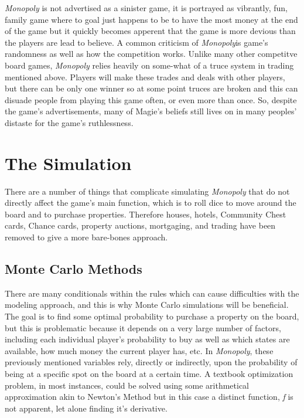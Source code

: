 \documentclass{article}
\begin{document}
\textit{Monopoly} is not advertised as a sinister game, it is portrayed as vibrantly, fun, family game where to goal just happens to be to have the most money at the end of the game but it quickly becomes apperent that the game is more devious than the players are lead to believe. A common criticism of  \textit{Monopoly}is game's randomness as well as how the competition works.  Unlike many other competitve board games, \textit{Monopoly} relies heavily on some-what of a truce system in trading mentioned above.  Players will make these trades and deals with other players, but there can be only one winner so at some point truces are broken and this can disuade people from playing this game often, or even more than once.  So, despite the game's advertisements, many of Magie's beliefs still lives on in many peoples' distaste for the game's ruthlessness.

\section{The Simulation}

There are a number of things that complicate simulating \textit{Monopoly} that do not directly affect the game’s main function, which is to roll dice to move around the board and to purchase properties.  Therefore houses, hotels, Community Chest cards, Chance cards, property auctions, mortgaging, and trading have been removed to give a more bare-bones approach.

\subsection{Monte Carlo Methods}

There are many conditionals within the rules which can cause difficulties with the modeling approach, and this is why Monte Carlo simulations will be beneficial.  The goal is to find some optimal probability to purchase a property on the board, but this is problematic because it depends on a very large number of factors, including each individual player’s probability to buy as well as which states are available, how much money the current player has, etc.  In \textit{Monopoly}, these previously mentioned variables rely, directly or indirectly, upon the probability of being at a specific spot on the board at a certain time.  A textbook optimization problem, in most instances, could be solved using some arithmetical approximation akin to Newton's Method but in this case a distinct function, \textit{f} is not apparent, let alone finding it's derivative.
\end{document}
